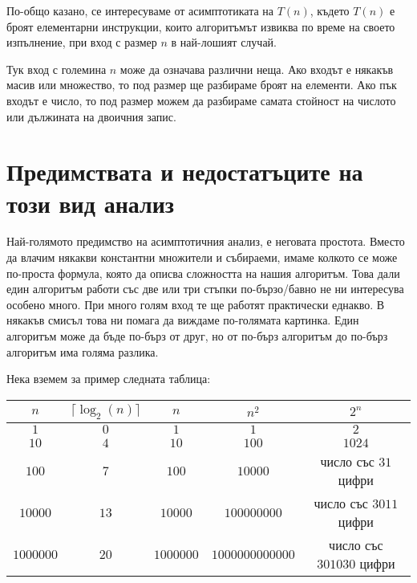 По-общо казано, се интересуваме от асимптотиката на $T(n)$, където $T(n)$ е броят елементарни инструкции, които алгоритъмът извиква по време на своето изпълнение, при вход с размер $n$ в най-лошият случай.

Тук вход с големина $n$ може да означава различни неща.
Ако входът е някакъв масив или множество, то под размер ще разбираме броят на елементи.
Ако пък входът е число, то под размер можем да разбираме самата стойност на числото или дължината на двоичния запис.

\section{Предимствата и недостатъците на този вид анализ}

Най-голямото предимство на асимптотичния анализ, е неговата простота.
Вместо да влачим някакви константни множители и събираеми, имаме колкото се може по-проста формула, която да описва сложността на нашия алгоритъм.
Това дали един алгоритъм работи със две или три стъпки по-бързо/бавно не ни интересува особено много.
При много голям вход те ще работят практически еднакво.
В някакъв смисъл това ни помага да виждаме по-голямата картинка.
Един алгоритъм може да бъде по-бърз от друг, но от по-бърз алгоритъм до по-бърз алгоритъм има голяма разлика.

Нека вземем за пример следната таблица:
\begin{center}
  \begin{tabular}{|c|c|c|c|c|}
    \hline
    $n$       & $\lceil\log_2(n)\rceil$ & $n$       & $n^2$           & $2^n$                    \\
    \hline
    $1$       & $0$                     & $1$       & $1$             & $2$                      \\
    \hline
    $10$      & $4$                     & $10$      & $100$           & $1024$                   \\
    \hline
    $100$     & $7$                     & $100$     & $10000$         & число със $31$ цифри     \\
    \hline
    $10000$   & $13$                    & $10000$   & $100000000$     & число със $3011$ цифри   \\
    \hline
    $1000000$ & $20$                    & $1000000$ & $1000000000000$ & число със $301030$ цифри \\
    \hline
  \end{tabular}
\end{center}

